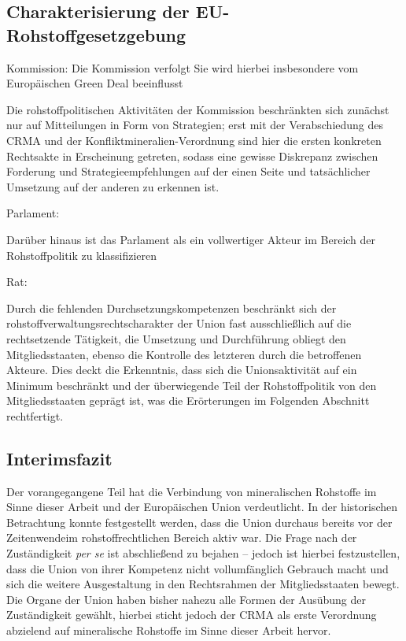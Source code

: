 \documentclass[12pt,a4paper,oneside]{book} %
\begin{document}
\subsection{Charakterisierung der EU-Rohstoffgesetzgebung}

Kommission: Die Kommission verfolgt 
Sie wird hierbei insbesondere vom Europäischen Green Deal beeinflusst

Die rohstoffpolitischen Aktivitäten der Kommission beschränkten sich zunächst nur auf Mitteilungen in Form von Strategien; erst mit der Verabschiedung des CRMA und der Konfliktmineralien-Verordnung sind hier die ersten konkreten Rechtsakte in Erscheinung getreten, sodass eine gewisse Diskrepanz zwischen Forderung und Strategieempfehlungen auf der einen Seite und tatsächlicher Umsetzung auf der anderen zu erkennen ist.

Parlament: 

Darüber hinaus ist das Parlament als ein vollwertiger Akteur im Bereich der Rohstoffpolitik zu klassifizieren

Rat:



Durch die fehlenden Durchsetzungskompetenzen beschränkt sich der rohstoffverwaltungsrechtscharakter der Union fast ausschließlich auf die rechtsetzende Tätigkeit, die Umsetzung und Durchführung obliegt den Mitgliedsstaaten, ebenso die Kontrolle des letzteren durch die betroffenen Akteure. Dies deckt die Erkenntnis, dass sich die Unionsaktivität auf ein Minimum beschränkt und der überwiegende Teil der Rohstoffpolitik von den Mitgliedsstaaten geprägt ist, was die Erörterungen im Folgenden Abschnitt rechtfertigt.


\subsection{Interimsfazit}
Der vorangegangene Teil hat die Verbindung von mineralischen Rohstoffe im Sinne dieser Arbeit und der Europäischen Union verdeutlicht. In der historischen Betrachtung konnte festgestellt werden, dass die Union durchaus bereits vor der \glqq Zeitenwende\grqq im rohstoffrechtlichen Bereich aktiv war.
Die Frage nach der Zuständigkeit \textit{per se} ist abschließend zu bejahen -- jedoch ist hierbei festzustellen, dass die Union von ihrer Kompetenz nicht vollumfänglich Gebrauch macht und sich die weitere Ausgestaltung in den Rechtsrahmen der Mitgliedsstaaten bewegt.
Die Organe der Union haben bisher nahezu alle Formen der Ausübung der Zuständigkeit gewählt, hierbei sticht jedoch der CRMA als erste Verordnung abzielend auf mineralische Rohstoffe im Sinne dieser Arbeit hervor.
\end{document}
